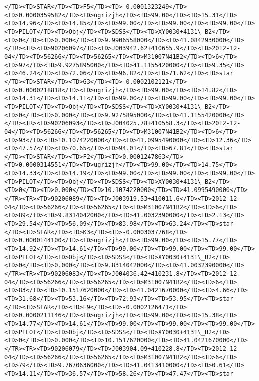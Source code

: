 \documentclass[11pt]{article}
\begin{document}
\begin{Verbatim}[commandchars=\\\{\}]
</TD><TD>STAR</TD><TD>F5</TD><TD>-0.0001323249</TD><TD>0.0000359582</TD><TD>ugrizjh</TD><TD>99.00</TD><TD>15.31</TD><TD>14.96</TD><TD>14.85</TD><TD>99.00</TD><TD>99.00</TD><TD>99.00</TD><TD>PILOT</TD><TD>Obj</TD><TD>SDSS</TD><TD>XY0030+4131\_B2</TD><TD>0</TD><TD>0.000</TD><TD>9.9906558000</TD><TD>41.0842930000</TD></TR><TR><TD>90206097</TD><TD>J003942.62+410655.9</TD><TD>2012-12-04</TD><TD>56266</TD><TD>56265</TD><TD>M31007N41B2</TD><TD>6</TD><TD>97</TD><TD>9.9275895000</TD><TD>41.1155420000</TD><TD>9.35</TD><TD>46.24</TD><TD>72.06</TD><TD>96.82</TD><TD>71.62</TD><TD>star      </TD><TD>STAR</TD><TD>G3</TD><TD>-0.0002102121</TD><TD>0.0000218818</TD><TD>ugrizjh</TD><TD>99.00</TD><TD>14.82</TD><TD>14.31</TD><TD>14.11</TD><TD>99.00</TD><TD>99.00</TD><TD>99.00</TD><TD>PILOT</TD><TD>Obj</TD><TD>SDSS</TD><TD>XY0030+4131\_B2</TD><TD>0</TD><TD>0.000</TD><TD>9.9275895000</TD><TD>41.1155420000</TD></TR><TR><TD>90206093</TD><TD>J004025.78+410558.3</TD><TD>2012-12-04</TD><TD>56266</TD><TD>56265</TD><TD>M31007N41B2</TD><TD>6</TD><TD>93</TD><TD>10.1074220000</TD><TD>41.0995490000</TD><TD>12.36</TD><TD>47.57</TD><TD>70.65</TD><TD>94.01</TD><TD>67.81</TD><TD>star      </TD><TD>STAR</TD><TD>F2</TD><TD>0.0001247863</TD><TD>0.0000314551</TD><TD>ugrizjh</TD><TD>99.00</TD><TD>14.75</TD><TD>14.33</TD><TD>14.19</TD><TD>99.00</TD><TD>99.00</TD><TD>99.00</TD><TD>PILOT</TD><TD>Obj</TD><TD>SDSS</TD><TD>XY0030+4131\_B2</TD><TD>0</TD><TD>0.000</TD><TD>10.1074220000</TD><TD>41.0995490000</TD></TR><TR><TD>90206089</TD><TD>J003919.53+410011.6</TD><TD>2012-12-04</TD><TD>56266</TD><TD>56265</TD><TD>M31007N41B2</TD><TD>6</TD><TD>89</TD><TD>9.8314042000</TD><TD>41.0032390000</TD><TD>2.13</TD><TD>29.54</TD><TD>56.09</TD><TD>83.98</TD><TD>63.24</TD><TD>star      </TD><TD>STAR</TD><TD>K3</TD><TD>-0.0003037768</TD><TD>0.0000144100</TD><TD>ugrizjh</TD><TD>99.00</TD><TD>15.77</TD><TD>14.92</TD><TD>14.61</TD><TD>99.00</TD><TD>99.00</TD><TD>99.00</TD><TD>PILOT</TD><TD>Obj</TD><TD>SDSS</TD><TD>XY0030+4131\_B2</TD><TD>0</TD><TD>0.000</TD><TD>9.8314042000</TD><TD>41.0032390000</TD></TR><TR><TD>90206083</TD><TD>J004036.42+410231.8</TD><TD>2012-12-04</TD><TD>56266</TD><TD>56265</TD><TD>M31007N41B2</TD><TD>6</TD><TD>83</TD><TD>10.1517620000</TD><TD>41.0421670000</TD><TD>4.66</TD><TD>31.68</TD><TD>53.16</TD><TD>72.93</TD><TD>53.95</TD><TD>star      </TD><TD>STAR</TD><TD>F9</TD><TD>-0.0002126471</TD><TD>0.0000211146</TD><TD>ugrizjh</TD><TD>99.00</TD><TD>15.38</TD><TD>14.77</TD><TD>14.61</TD><TD>99.00</TD><TD>99.00</TD><TD>99.00</TD><TD>PILOT</TD><TD>Obj</TD><TD>SDSS</TD><TD>XY0030+4131\_B2</TD><TD>0</TD><TD>0.000</TD><TD>10.1517620000</TD><TD>41.0421670000</TD></TR><TR><TD>90206079</TD><TD>J003904.09+410228.8</TD><TD>2012-12-04</TD><TD>56266</TD><TD>56265</TD><TD>M31007N41B2</TD><TD>6</TD><TD>79</TD><TD>9.7670636000</TD><TD>41.0413410000</TD><TD>0.61</TD><TD>14.11</TD><TD>36.57</TD><TD>58.26</TD><TD>47.47</TD><TD>star      
\end{Verbatim}
\end{document}

